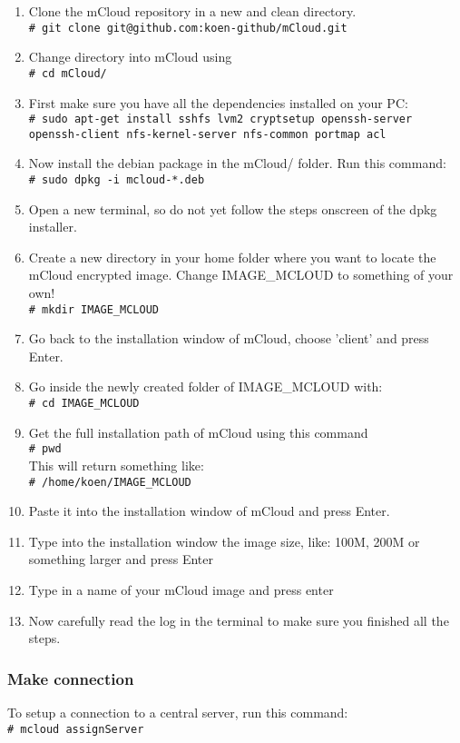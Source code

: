 \documentclass{article}
\newcommand{\shellcmd}[1]{\\\indent\indent\texttt{\footnotesize\# #1}\\}
\begin{document}
\begin{enumerate}
    \item Clone the mCloud repository in a new and clean directory.
    \shellcmd{git clone git@github.com:koen-github/mCloud.git}
    \item Change directory into mCloud using
    \shellcmd{cd mCloud/}
    \item First make sure you have all the dependencies installed on your PC:
    \shellcmd{sudo apt-get install sshfs lvm2 cryptsetup openssh-server openssh-client nfs-kernel-server nfs-common portmap acl}
    \item Now install the debian package in the mCloud/ folder. Run this command:
    \shellcmd{sudo dpkg -i mcloud-*.deb}
    
    \item Open a new terminal, so do not yet follow the steps onscreen of the dpkg installer.
    
    \item Create a new directory in your home folder where you want to locate the mCloud encrypted image.
    Change IMAGE\_MCLOUD to something of your own!
    \shellcmd{mkdir IMAGE\_MCLOUD}
    
    \item Go back to the installation window of mCloud, choose 'client' and press Enter.
    \item Go inside the newly created folder of IMAGE\_MCLOUD with: \shellcmd{cd IMAGE\_MCLOUD}
    
    \item Get the full installation path of mCloud using this command \shellcmd{pwd} This will return something like: 
    \shellcmd{/home/koen/IMAGE\_MCLOUD}
    
    \item Paste it into the installation window of mCloud and press Enter.
    
    \item Type into the installation window the image size, like: 100M, 200M or something larger and press Enter
    
    \item Type in a name of your mCloud image and press enter
    
    \item Now carefully read the log in the terminal to make sure you finished all the steps. 
\end{enumerate}

\subsubsection{Make connection}
To setup a connection to a central server, run this command:  \shellcmd{mcloud assignServer} 
\end{document}
